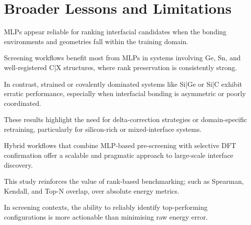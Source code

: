 \section{Broader Lessons and Limitations} \label{section:broader_lessons_and_limitations}


MLPs appear reliable for ranking interfacial candidates when the bonding environments and geometries fall within the
training domain.

Screening workflows benefit most from MLPs in systems involving Ge, Sn, and well-registered C|X structures, where rank
preservation is consistently strong.

In contrast, strained or covalently dominated systems like Si|Ge or Si|C exhibit erratic performance, especially when
interfacial bonding is asymmetric or poorly coordinated.


These results highlight the need for delta-correction strategies or domain-specific retraining, particularly for
silicon-rich or mixed-interface systems.

Hybrid workflows that combine MLP-based pre-screening with selective DFT confirmation offer a scalable and pragmatic
approach to large-scale interface discovery.


This study reinforces the value of rank-based benchmarking; such as Spearman, Kendall, and Top-N overlap, over absolute
energy metrics.

In screening contexts, the ability to reliably identify top-performing configurations is more actionable than minimising
raw energy error.

